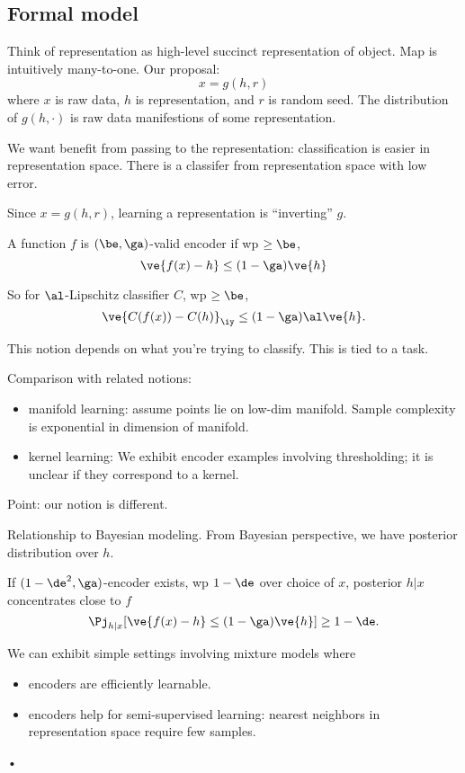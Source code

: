 \subsection{Formal model}

Think of representation as high-level succinct representation of object. Map is intuitively many-to-one. Our proposal:
$$x=g(h,r)$$
where $x$ is raw data, $h$ is representation, and $r$ is random seed. 
The distribution of $g(h,\cdot)$ is raw data manifestions of some representation.

We want benefit from passing to the representation: classification is easier in representation space. There is a classifer from representation space with low error.

Since $x=g(h,r)$, learning a representation is ``inverting'' $g$.

\begin{df}
A function $f$ is $(\be,\ga)$-valid encoder if wp $\ge \be$, 
$$
\ve{f(x)-h} \le (1-\ga )\ve{h}
$$
\end{df}
So for $\al$-Lipschitz classifier $C$, wp $\ge \be$,
$$
\ve{C(f(x))-C(h)}_\iy\le (1-\ga)\al\ve{h}.
$$

This notion depends on what you're trying to classify. This is tied to a task.

Comparison with related notions:
\begin{itemize}
\item
manifold learning: assume points lie on low-dim manifold. Sample complexity is exponential in dimension of manifold.
\item
kernel learning: 
We exhibit encoder examples involving thresholding; it is unclear if they correspond to a kernel.
\end{itemize}
Point: our notion is different.

Relationship to Bayesian modeling. 
From Bayesian perspective, we have posterior distribution over $h$. 
\begin{thm}
If $(1-\de^2, \ga)$-encoder exists, wp $1-\de$ over choice of $x$, posterior $h|x$ concentrates close to $f$
$$
\Pj_{h|x} [\ve{f(x)-h}\le (1-\ga)\ve{h}]\ge 1-\de.
$$
\end{thm}
We can exhibit simple settings involving mixture models where 
\begin{itemize}
\item
encoders are efficiently learnable.
\item
encoders help for semi-supervised learning: nearest neighbors in representation space require few samples.
\end{itemize}•

